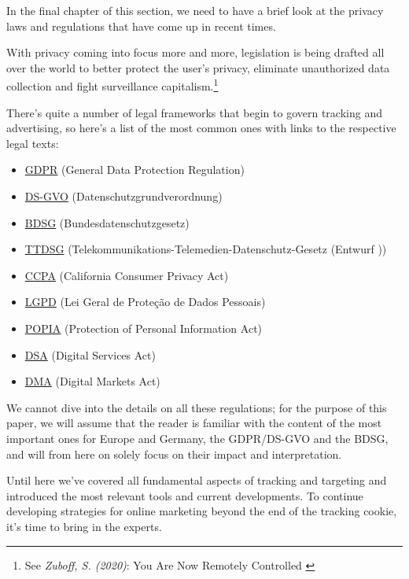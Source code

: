 In the final chapter of this section, we need to have a brief look at the privacy laws and regulations that have come up in recent times. 

With privacy coming into focus more and more, legislation is being drafted all over the world to better protect the user's privacy, eliminate unauthorized data collection and fight surveillance capitalism.\footnote{See \textit{Zuboff, S. (2020)}: You Are Now Remotely Controlled \cite{surveillance}} 

There's quite a number of legal frameworks that begin to govern tracking and advertising, so here's a list of the most common ones with links to the respective legal texts:

\begin{itemize}
 \item \href{https://gdpr-info.eu/}{GDPR} (General Data Protection Regulation)
 \item \href{https://www.datenschutz-grundverordnung.eu/}{DS-GVO} (Datenschutzgrundverordnung)
 \item \href{https://dsgvo-gesetz.de/bdsg/}{BDSG} (Bundesdatenschutzgesetz)
 \item \href{https://dsgvo-gesetz.de/ttdsg/}{TTDSG} (Telekommunikations-Telemedien-Datenschutz-Gesetz (Entwurf ))
 \item \href{https://oag.ca.gov/privacy/ccpa}{CCPA} (California Consumer Privacy Act)
 \item \href{https://www.lgpdbrasil.com.br/}{LGPD} (Lei Geral de Proteção de Dados Pessoais)
 \item \href{https://popia.co.za/}{POPIA} (Protection of Personal Information Act)
 \item \href{https://ec.europa.eu/info/strategy/priorities-2019-2024/europe-fit-digital-age/digital-services-act-ensuring-safe-and-accountable-online-environment_en}{DSA} (Digital Services Act)
 \item \href{https://ec.europa.eu/info/strategy/priorities-2019-2024/europe-fit-digital-age/digital-markets-act-ensuring-fair-and-open-digital-markets_en}{DMA} (Digital Markets Act)
\end{itemize}

We cannot dive into the details on all these regulations; for the purpose of this paper, we will assume that the reader is familiar with the content of the most important ones for Europe and Germany, the GDPR/DS-GVO and the BDSG, and will from here on solely focus on their impact and interpretation.

Until here we've covered all fundamental aspects of tracking and targeting and introduced the most relevant tools and current developments. To continue developing strategies for online marketing beyond the end of the tracking cookie, it's time to bring in the experts.
